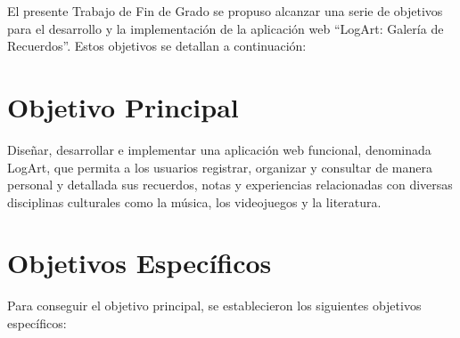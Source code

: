 El presente Trabajo de Fin de Grado se propuso alcanzar una serie de objetivos para el desarrollo y la implementación de la aplicación web ``LogArt: Galería de Recuerdos''. Estos objetivos se detallan a continuación:

\section{Objetivo Principal}
\label{sec:objetivoPrincipal}

Diseñar, desarrollar e implementar una aplicación web funcional, denominada LogArt, que permita a los usuarios registrar, organizar y consultar de manera personal y detallada sus recuerdos, notas y experiencias relacionadas con diversas disciplinas culturales como la música, los videojuegos y la literatura.

\section{Objetivos Específicos}
\label{sec:objetivosEspecificos}

Para conseguir el objetivo principal, se establecieron los siguientes objetivos específicos:

